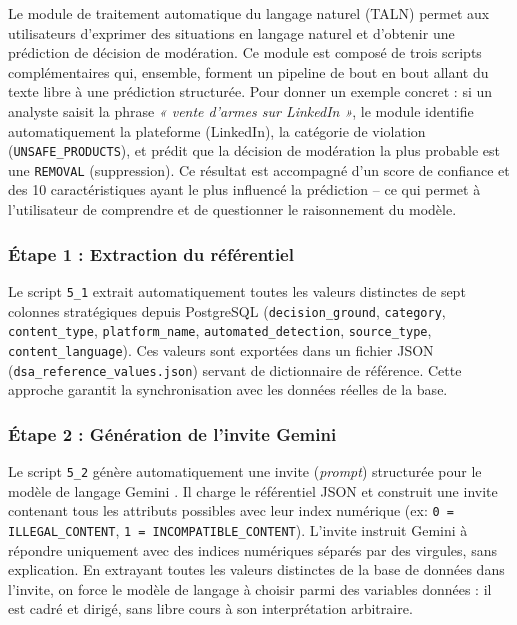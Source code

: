 \documentclass[10pt,twocolumn,a4paper]{article}
\begin{document}
Le module de traitement automatique du langage naturel (TALN) permet aux utilisateurs d'exprimer des situations en langage naturel et d'obtenir une prédiction de décision de modération. Ce module est composé de trois scripts complémentaires qui, ensemble, forment un pipeline de bout en bout allant du texte libre à une prédiction structurée. Pour donner un exemple concret : si un analyste saisit la phrase \textit{« vente d'armes sur LinkedIn »}, le module identifie automatiquement la plateforme (LinkedIn), la catégorie de violation (\texttt{UNSAFE\_PRODUCTS}), et prédit que la décision de modération la plus probable est une \texttt{REMOVAL} (suppression). Ce résultat est accompagné d'un score de confiance et des 10 caractéristiques ayant le plus influencé la prédiction -- ce qui permet à l'utilisateur de comprendre et de questionner le raisonnement du modèle.

\subsubsection{Étape 1 : Extraction du référentiel}

Le script \texttt{5\_1} extrait automatiquement toutes les valeurs distinctes de sept colonnes stratégiques depuis PostgreSQL (\texttt{decision\_ground}, \texttt{category}, \texttt{content\_type}, \texttt{platform\_name}, \texttt{automated\_detection}, \texttt{source\_type}, \texttt{content\_language}). Ces valeurs sont exportées dans un fichier JSON (\texttt{dsa\_reference\_values.json}) servant de dictionnaire de référence. Cette approche garantit la synchronisation avec les données réelles de la base.

\subsubsection{Étape 2 : Génération de l'invite Gemini}

Le script \texttt{5\_2} génère automatiquement une invite (\textit{prompt}) structurée pour le modèle de langage Gemini \cite{gemini}. Il charge le référentiel JSON et construit une invite contenant tous les attributs possibles avec leur index numérique (ex: \texttt{0 = ILLEGAL\_CONTENT}, \texttt{1 = INCOMPATIBLE\_CONTENT}). L'invite instruit Gemini à répondre uniquement avec des indices numériques séparés par des virgules, sans explication. En extrayant toutes les valeurs distinctes de la base de données dans l'invite, on force le modèle de langage à choisir parmi des variables données : il est cadré et dirigé, sans libre cours à son interprétation arbitraire.
\end{document}
